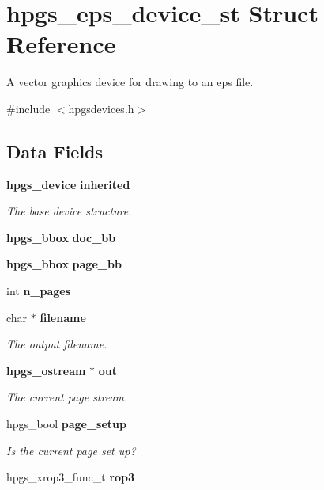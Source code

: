 \section{hpgs\_\-eps\_\-device\_\-st Struct Reference}
\label{structhpgs__eps__device__st}


A vector graphics device for drawing to an eps file.  




{\ttfamily \#include $<$hpgsdevices.h$>$}

\subsection*{Data Fields}
\begin{DoxyCompactItemize}
\item 
{\bf hpgs\_\-device} {\bf inherited}\label{structhpgs__eps__device__st_af985e290744ee409439ed1870b6f7003}

\begin{DoxyCompactList}\small\item\em The base device structure. \item\end{DoxyCompactList}\item 
{\bf hpgs\_\-bbox} {\bfseries doc\_\-bb}\label{structhpgs__eps__device__st_a86f192552c39e581d72aefb268c21cd1}

\item 
{\bf hpgs\_\-bbox} {\bf page\_\-bb}
\item 
int {\bf n\_\-pages}
\item 
char $\ast$ {\bf filename}
\begin{DoxyCompactList}\small\item\em The output filename. \item\end{DoxyCompactList}\item 
{\bf hpgs\_\-ostream} $\ast$ {\bf out}\label{structhpgs__eps__device__st_ab89548e41f4befb13c7ce0aca6829f66}

\begin{DoxyCompactList}\small\item\em The current page stream. \item\end{DoxyCompactList}\item 
hpgs\_\-bool {\bf page\_\-setup}\label{structhpgs__eps__device__st_a504b15d2a3068d155b9bbbc9b7eb983b}

\begin{DoxyCompactList}\small\item\em Is the current page set up? \item\end{DoxyCompactList}\item 
hpgs\_\-xrop3\_\-func\_\-t {\bf rop3}\label{structhpgs__eps__device__st_a1480c62b7e21dfeb710a618951e02c5a}


\end{DoxyCompactItemize}
